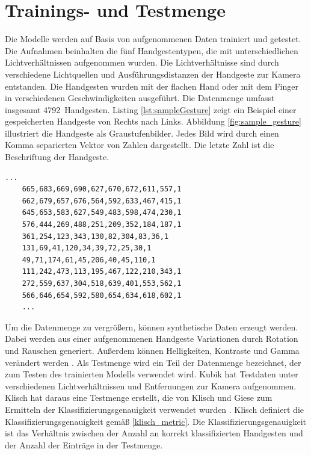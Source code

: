 \section{Trainings- und Testmenge}
\label{sec:synthetischeDaten}
\label{sec:testdaten}
Die Modelle werden auf Basis von aufgenommenen Daten trainiert und getestet. Die Aufnahmen beinhalten die fünf Handgestentypen, die mit unterschiedlichen Lichtverhältnissen aufgenommen wurden. Die Lichtverhältnisse
sind durch verschiedene Lichtquellen und Ausführungsdistanzen der Handgeste zur Kamera entstanden. Die Handgesten wurden mit der flachen Hand oder mit dem Finger in verschiedenen Geschwindigkeiten ausgeführt.
Die Datenmenge umfasst insgesamt 4792~Handgesten.
\newline
\newline
Listing \ref{lst:sampleGesture} zeigt ein Beispiel einer gespeicherten Handgeste von Rechts nach Links. Abbildung \ref{fig:sample_gesture} illustriert die Handgeste als Graustufenbilder.
Jedes Bild wird durch einen Komma separierten Vektor von Zahlen dargestellt. Die letzte Zahl ist die Beschriftung der Handgeste.
\begin{lstlisting}[label=lst:sampleGesture,caption={Beispiel einer gespeicherten Handgeste von Rechts nach Links.}]
    ...
    665,683,669,690,627,670,672,611,557,1
    662,679,657,676,564,592,633,467,415,1
    645,653,583,627,549,483,598,474,230,1
    576,444,269,488,251,209,352,184,187,1
    361,254,123,343,130,82,304,83,36,1
    131,69,41,120,34,39,72,25,30,1
    49,71,174,61,45,206,40,45,110,1
    111,242,473,113,195,467,122,210,343,1
    272,559,637,304,518,639,401,553,562,1
    566,646,654,592,580,654,634,618,602,1
    ...
\end{lstlisting}
Um die Datenmenge zu vergrößern, können synthetische Daten erzeugt werden. Dabei werden aus einer aufgenommenen Handgeste Variationen durch Rotation und Rauschen generiert. Außerdem können Helligkeiten,
Kontraste und Gamma verändert werden \cite{venzkeArticle}.
\newline
\newline
Als Testmenge wird ein Teil der Datenmenge bezeichnet, der zum Testen des trainierten Modells verwendet wird. Kubik hat Testdaten unter verschiedenen Lichtverhältnissen und Entfernungen zur Kamera aufgenommen.
Klisch hat daraus eine Testmenge erstellt, die von Klisch und Giese zum Ermitteln der Klassifizierungsgenauigkeit verwendet wurden \cite{klischThesis, gieseThesis}. Klisch definiert die
Klassifizierungsgenauigkeit gemäß \ref{klisch_metric}. Die Klassifizierungsgenauigkeit ist das Verhältnis zwischen der Anzahl an korrekt klassifizierten Handgesten und der Anzahl der Einträge in der Testmenge.
